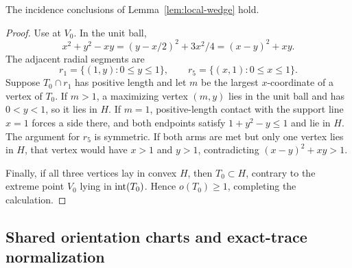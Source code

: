 \begin{lemma}
\label{lem:app-local-wedge-calculation}
The incidence conclusions of Lemma~\ref{lem:local-wedge} hold.
\end{lemma}

\begin{proof}
Use  at $V_0$. In the unit ball,
\[
 x^2+y^2-xy=(y-x/2)^2+3x^2/4=(x-y)^2+xy.
\]
The adjacent radial segments are
\[
 r_1=\{(1,y):0\le y\le1\},\qquad
 r_5=\{(x,1):0\le x\le1\}.
\]
Suppose $T_0\cap r_1$ has positive length and let $m$ be the largest
$x$-coordinate of a vertex of $T_0$.  If $m>1$, a maximizing vertex $(m,y)$
lies in the unit ball and has $0<y<1$, so it lies in $H$.  If $m=1$,
positive-length contact with the support line $x=1$ forces a side there, and
both endpoints satisfy $1+y^2-y\le1$ and lie in $H$.  The argument for
$r_5$ is symmetric.  If both arms are met but only one vertex lies in $H$,
that vertex would have $x>1$ and $y>1$, contradicting
$(x-y)^2+xy>1$.

Finally, if all three vertices lay in convex $H$, then $T_0\subset H$,
contrary to the extreme point $V_0$ lying in $\mathrm{int}(T_0)$.  Hence
$o(T_0)\ge1$, completing the calculation.
\end{proof}

\subsection{Shared orientation charts and exact-trace normalization}
\label{subsec:app-exact-trace-normalization}

